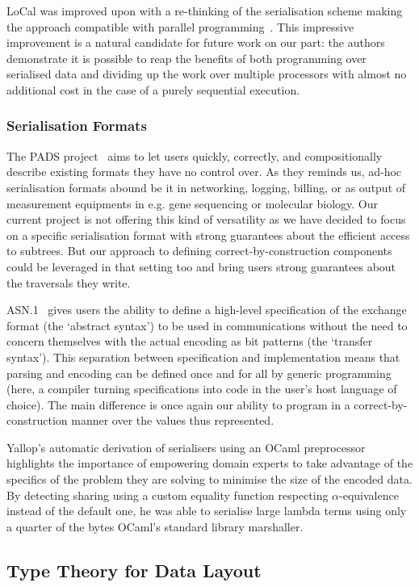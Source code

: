 LoCal was improved upon with a re-thinking of the serialisation scheme
making the approach compatible with parallel
programming~\cite{DBLP:journals/pacmpl/KoparkarRVKN21}.
This impressive improvement is a natural candidate for future work on our
part: the authors demonstrate it is possible to reap the benefits of
both programming over serialised data
and dividing up the work over multiple processors
with almost no additional cost in the case of a purely sequential execution.

\subsubsection{Serialisation Formats}

The PADS project~\cite{DBLP:conf/popl/MandelbaumFWFG07} aims to let users
quickly, correctly, and compositionally describe existing formats they
have no control over.
%
As they reminds us, ad-hoc serialisation formats abound be it in
networking, logging, billing, or as output of measurement equipments
in e.g. gene sequencing or molecular biology.
%
Our current project is not offering this kind of versatility as we have
decided to focus on a specific serialisation format with strong
guarantees about the efficient access to subtrees.
%
But our approach to defining correct-by-construction components could
be leveraged in that setting too and bring users strong guarantees about
the traversals they write.

ASN.1~\cite{MANUAL:book/larmouth1999} gives users the ability to define
a high-level specification of the exchange format (the `abstract syntax')
to be used in communications without the need to concern themselves with
the actual encoding as bit patterns (the `transfer syntax').
%
This separation between specification and implementation means that parsing
and encoding can be defined once and for all by generic programming
(here, a compiler turning specifications into code in the user's host
language of choice).
%
The main difference is once again our ability to program in a
correct-by-construction manner over the values thus represented.


Yallop's automatic derivation of serialisers using an OCaml
preprocessor~\cite{DBLP:conf/ml/Yallop07} highlights the importance
of empowering domain experts to take advantage of the specifics of
the problem they are solving to minimise the size of the encoded data.
%
By detecting sharing using a custom equality function respecting
$\alpha$-equivalence instead of the default one, he was able to
serialise large lambda terms using only
a quarter of the bytes OCaml's standard library marshaller.

\subsection{Type Theory for Data Layout}

\cite{DBLP:conf/popl/PetersenHCP03}
